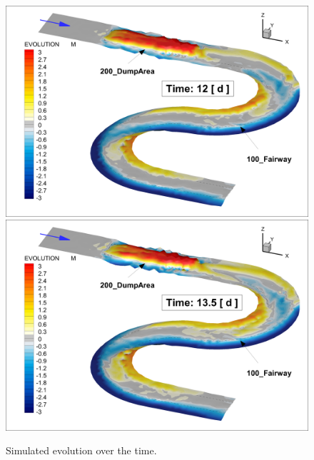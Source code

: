 \begin{figure} [!h]
\centering
\includegraphics[scale=0.14]{img/critDig_Poly_12p0d.png}
\includegraphics[scale=0.14]{img/critDig_Poly_13p5d.png}
\caption{Simulated evolution over the time.}\label{result78}
\end{figure}
